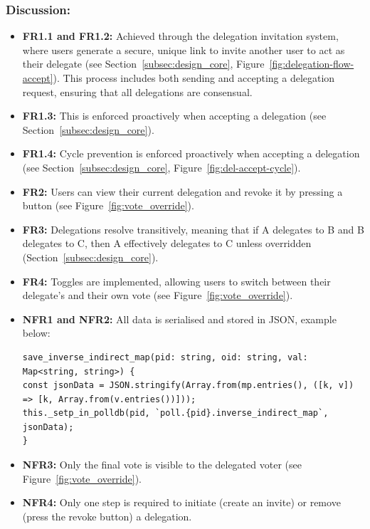 \subsubsection{Discussion:}

\begin{itemize}
    \item \textbf{FR1.1 and FR1.2:} Achieved through the delegation invitation system, where users generate a secure, unique link to invite another user to act as their delegate (see Section~\ref{subsec:design_core}, Figure~\ref{fig:delegation-flow-accept}). This process includes both sending and accepting a delegation request, ensuring that all delegations are consensual.
    \item \textbf{FR1.3:} This is enforced proactively when accepting a delegation (see Section~\ref{subsec:design_core}).
    \item \textbf{FR1.4:} Cycle prevention is enforced proactively when accepting a delegation (see Section~\ref{subsec:design_core}, Figure~\ref{fig:del-accept-cycle}).
    \item \textbf{FR2:} Users can view their current delegation and revoke it by pressing a button (see Figure~\ref{fig:vote_override}).
    \item \textbf{FR3:} Delegations resolve transitively, meaning that if A delegates to B and B delegates to C, then A effectively delegates to C unless overridden (Section~\ref{subsec:design_core}).
    \item \textbf{FR4:} Toggles are implemented, allowing users to switch between their delegate's and their own vote (see Figure~\ref{fig:vote_override}).
    \item \textbf{NFR1 and NFR2:} All data is serialised and stored in JSON, example below:
\begin{verbatim}
save_inverse_indirect_map(pid: string, oid: string, val: Map<string, string>) {
const jsonData = JSON.stringify(Array.from(mp.entries(), ([k, v]) => [k, Array.from(v.entries())]));
this._setp_in_polldb(pid, `poll.{pid}.inverse_indirect_map`, jsonData);
}
\end{verbatim}
    \item \textbf{NFR3:} Only the final vote is visible to the delegated voter (see Figure~\ref{fig:vote_override}).
    \item \textbf{NFR4:} Only one step is required to initiate (create an invite) or remove (press the revoke button) a delegation.
\end{itemize}


